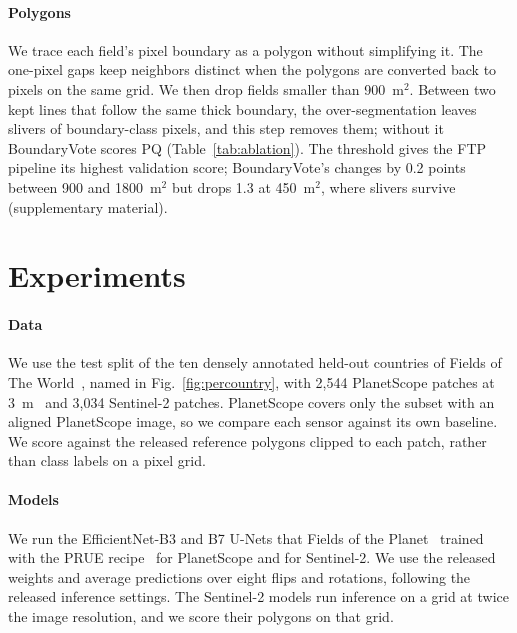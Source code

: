 \documentclass[journal]{IEEEtran}
\begin{document}
\paragraph{Polygons}
We trace each field's pixel boundary as a polygon without simplifying it.
The one-pixel gaps keep neighbors distinct when the polygons are converted back to pixels on the same grid.
We then drop fields smaller than 900~m$^2$.
Between two kept lines that follow the same thick boundary, the over-segmentation leaves slivers of boundary-class pixels, and this step removes them; without it BoundaryVote scores \OursNoFilterPQ{} PQ (Table~\ref{tab:ablation}).
The threshold gives the FTP pipeline its highest validation score; BoundaryVote's changes by 0.2 points between 900 and 1800~m$^2$ but drops 1.3 at 450~m$^2$, where slivers survive (supplementary material).

\section{Experiments}
\label{sec:experiments}

\paragraph{Data}
We use the test split of the ten densely annotated held-out countries of Fields of The World~\cite{kerner2024ftw}, named in Fig.~\ref{fig:percountry}, with 2,544 PlanetScope patches at 3~m~\cite{corley_ftp} and 3,034 Sentinel-2 patches.
PlanetScope covers only the subset with an aligned PlanetScope image, so we compare each sensor against its own baseline.
We score against the released reference polygons clipped to each patch, rather than class labels on a pixel grid.

\paragraph{Models}
We run the EfficientNet-B3 and B7 U-Nets that Fields of the Planet~\cite{corley_ftp} trained with the PRUE recipe~\cite{muhawenayo2026prue} for PlanetScope and for Sentinel-2.
We use the released weights and average predictions over eight flips and rotations, following the released inference settings.
The Sentinel-2 models run inference on a grid at twice the image resolution, and we score their polygons on that grid.
\end{document}
